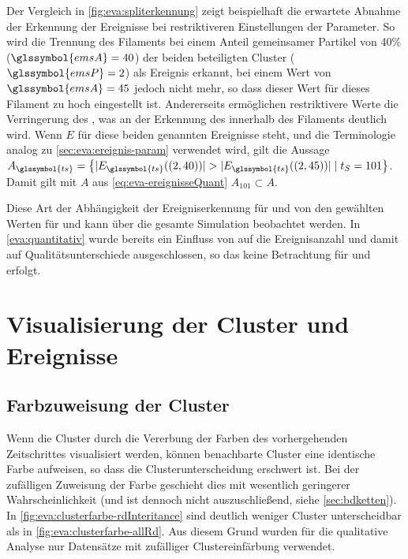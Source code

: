 Der Vergleich in \autoref{fig:eva:spliterkennung} zeigt beispielhaft die erwartete Abnahme der Erkennung der Ereignisse bei restriktiveren Einstellungen der Parameter. So wird die Trennung des Filaments bei einem Anteil gemeinsamer Partikel von 40\% ($\glssymbol{emsA} = 40$) der beiden beteiligten Cluster ($\glssymbol{emsP} = 2$) als Ereignis erkannt, bei einem Wert von $\glssymbol{emsA} = 45$ jedoch nicht mehr, so dass dieser Wert für dieses Filament zu hoch eingestellt ist. Andererseits ermöglichen restriktivere Werte die Verringerung des , was an der Erkennung des  innerhalb des Filaments deutlich wird. Wenn $E$ für diese beiden genannten Ereignisse steht, und die Terminologie analog zu \autoref{sec:eva:ereignis-param} verwendet wird, gilt die Aussage $A_{\glssymbol{ts}} = \left\lbrace |E_{\glssymbol{ts}}((2, 40))| > |E_{\glssymbol{ts}}((2, 45))| \; | \; t_S = 101 \right\rbrace$. Damit gilt mit $A$ aus \autoref{eq:eva-ereignisseQuant} $A_{101} \subset A$.

Diese Art der Abhängigkeit der Ereigniserkennung für  und  von den gewählten Werten für  und  kann über die gesamte Simulation beobachtet werden. In \autoref{eva:quantitativ} wurde bereits ein Einfluss von  auf die Ereignisanzahl und damit auf Qualitätsunterschiede ausgeschlossen, so das keine Betrachtung für  und  erfolgt.


\section{Visualisierung der Cluster und Ereignisse}

\subsection*{Farbzuweisung der Cluster}\label{sec:eva:clusterfarbe}
Wenn die Cluster durch die Vererbung der Farben des vorhergehenden Zeitschrittes visualisiert werden, können benachbarte Cluster eine identische Farbe aufweisen, so dass die Clusterunterscheidung erschwert ist. Bei der zufälligen Zuweisung der Farbe geschieht dies mit wesentlich geringerer Wahrscheinlichkeit (und ist dennoch nicht auszuschließend, siehe \autoref{sec:bdketten}). In \autoref{fig:eva:clusterfarbe-rdInteritance} sind deutlich weniger Cluster unterscheidbar als in \autoref{fig:eva:clusterfarbe-allRd}. Aus diesem Grund wurden für die qualitative Analyse nur Datensätze mit zufälliger Clustereinfärbung verwendet.

